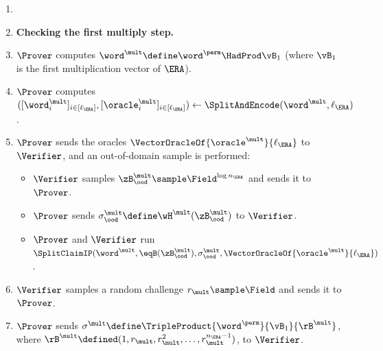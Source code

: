 \begin{tcolorbox}[breakable, enhanced, colback=white, boxrule=0.65pt]
\begin{enumerate}[nolistsep]
\begin{itemize}[nolistsep]
\begin{itemize}[nolistsep]
        \end{itemize}
        \item For each $i \in \{0,1\}$ and $j \in \{0,1\}$, $\Prover$ and $\Verifier$ run:
        \begin{itemize}[nolistsep]
            \item $\SplitClaimIP(\aB_{i+1}, \eqB(\rB^{\aB}_R, j), \sigma_{(i,\rB^{\aB}_R,j)}, \VectorOracleOf{\word^{\aB_{i+1}}}{\ell_{\ERA}})$, and
            \item $\SplitClaimIP(\bB_{i+1}, \eqB(\rB^{\bB}_R, j), \sigma_{(i,\rB^{\bB}_R,j)}, \VectorOracleOf{\word^{\bB_{i+1}}}{\ell_{\ERA}})$.
        \end{itemize}
        \end{itemize}

        \item[] \item[] \textbf{Checking the first multiply step.}
        \item $\Prover$ computes $\word^{\mult} \define \word^{\perm} \HadProd \vB_1$ (where $\vB_1$ is the first multiplication vector of $\ERA$).
        \item $\Prover$ computes $([\word^{\mult}_i]_{i \in [\ell_{\ERA}]}, [\oracle^{\mult}_i]_{i \in [\ell_{\ERA}]}) \gets \SplitAndEncode(\word^{\mult}, \ell_{\ERA})$.
        \item $\Prover$ sends the oracles $\VectorOracleOf{\oracle^{\mult}}{\ell_{\ERA}}$ to $\Verifier$, and an out-of-domain sample is performed:
        \begin{itemize}[nolistsep]
            \item $\Verifier$ samples $\zB^{\mult}_{\ood} \sample \Field^{\log n_{\ERA}}$ and sends it to $\Prover$.
            \item $\Prover$ sends $\sigma^{\mult}_{\ood} \define \wH^{\mult}(\zB^{\mult}_{\ood})$ to $\Verifier$.
            \item $\Prover$ and $\Verifier$ run $\SplitClaimIP(\word^{\mult}, \eqB(\zB^{\mult}_{\ood}), \sigma^{\mult}_{\ood}, \VectorOracleOf{\oracle^{\mult}}{\ell_{\ERA}})$.
        \end{itemize}
        \item $\Verifier$ samples a random challenge $r_{\mult} \sample \Field$ and sends it to $\Prover$.
        \item $\Prover$ sends $\sigma^{\mult} \define \TripleProduct{\word^{\perm}}{\vB_1}{\rB^{\mult}}$, where $\rB^{\mult} \defined (1, r_{\mult}, r_{\mult}^2, \dotsc, r_{\mult}^{n_{\ERA}-1})$, to $\Verifier$.

\end{enumerate}
\end{tcolorbox}
